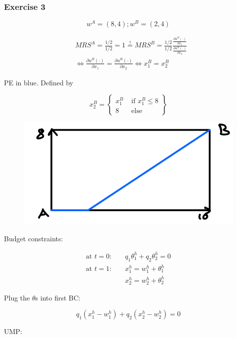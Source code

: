 {
\subsubsection*{Exercise 3} %

$$
w^{A}=(8,4) ; w^{B}=(2,4)
$$

\begin{enumerate}[label=(\alph*)]
{\item
$$
\begin{aligned}
& M R S^{A}=\frac{1 / 2}{1 / 2}=1 \stackrel{!}{=} MRS^{B}=\frac{1 / 2}{1 / 2} \frac{\frac{\partial u^{B}(\cdot)}{\partial x_{1}}}{\frac{\partial u^{B}(\cdot)}{\partial x_{2}}} \\
& \Longleftrightarrow \frac{\partial u^{B} \left(\cdot\right)}{\partial x_{1}}=\frac{\partial u^{B}(\cdot)}{\partial x_{2}} \Longleftrightarrow x_{1}^{B}=x_{2}^{B}
\end{aligned}
$$

PE in blue. Defined by

$$
x_{2}^{B}=\left\{\begin{array}{ll}
x_{1}^{B} & \text { if } x_{1}^{B} \leq 8 \\
8 & \text { else }
\end{array}\right\}
$$

\begin{figure}[!h]
    \centering
    \includegraphics[width=.5\textwidth]{images/2015_16_3.png}
\end{figure}
}
{\item 
Budget constraints:

\begin{align*}
    \text{at } t = 0: \quad & q_1 \theta_1^h+q_2 \theta_2^h=0 \\
    \text{at } t = 1: \quad & x_1^h=w_1^h+\theta_1^h \\
    & x_2^h=w_2^h+\theta_2^h
\end{align*}

Plug the $\theta$s into first BC:

$$
q_{1}\left(x_{1}^{h}-w_{1}^{h}\right)+q_{2}\left(x_{2}^{h}-w_{2}^{h}\right)=0
$$

UMP:

}
\end{enumerate}}
